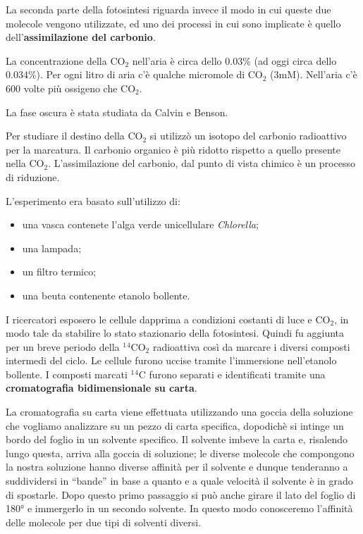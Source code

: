 \documentclass[]{article}
\begin{document}
La seconda parte della fotosintesi riguarda invece il modo in cui queste
due molecole vengono utilizzate, ed uno dei processi in cui sono
implicate è quello dell'\textbf{assimilazione del carbonio}.

La concentrazione della CO$_2$ nell'aria è circa dello 0.03\% (ad oggi
circa dello 0.034\%). Per ogni litro di aria c'è qualche micromole di
CO$_2$ (3mM). Nell'aria c'è 600 volte più ossigeno che CO$_2$.

La fase oscura è stata studiata da Calvin e Benson.

Per studiare il destino della CO$_2$ si utilizzò un isotopo del carbonio
radioattivo per la marcatura. Il carbonio organico è più ridotto
rispetto a quello presente nella CO$_2$. L'assimilazione del carbonio,
dal punto di vista chimico è un processo di riduzione.

L'esperimento era basato sull'utilizzo di:

\begin{itemize}
\itemsep1pt\parskip0pt
\item
  una vasca contenete l'alga verde unicellulare \emph{Chlorella};
\item
  una lampada;
\item
  un filtro termico;
\item
  una beuta contenente etanolo bollente.
\end{itemize}

I ricercatori esposero le cellule dapprima a condizioni costanti di luce
e CO$_2$, in modo tale da stabilire lo stato stazionario della
fotosintesi. Quindi fu aggiunta per un breve periodo della
$^1$$^4$CO$_2$ radioattiva così da marcare i diversi composti intermedi
del ciclo. Le cellule furono uccise tramite l'immersione nell'etanolo
bollente. I composti marcati $^1$$^4$C furono separati e identificati
tramite una \textbf{cromatografia bidimensionale su carta}.

La cromatografia su carta viene effettuata utilizzando una goccia della
soluzione che vogliamo analizzare su un pezzo di carta specifica,
dopodichè si intinge un bordo del foglio in un solvente specifico. Il
solvente imbeve la carta e, risalendo lungo questa, arriva alla goccia
di soluzione; le diverse molecole che compongono la nostra soluzione
hanno diverse affinità per il solvente e dunque tenderanno a
suddividersi in ``bande'' in base a quanto e a quale velocità il
solvente è in grado di spostarle. Dopo questo primo passaggio si può
anche girare il lato del foglio di 180° e immergerlo in un secondo
solvente. In questo modo conosceremo l'affinità delle molecole per due
tipi di solventi diversi.
\end{document}
